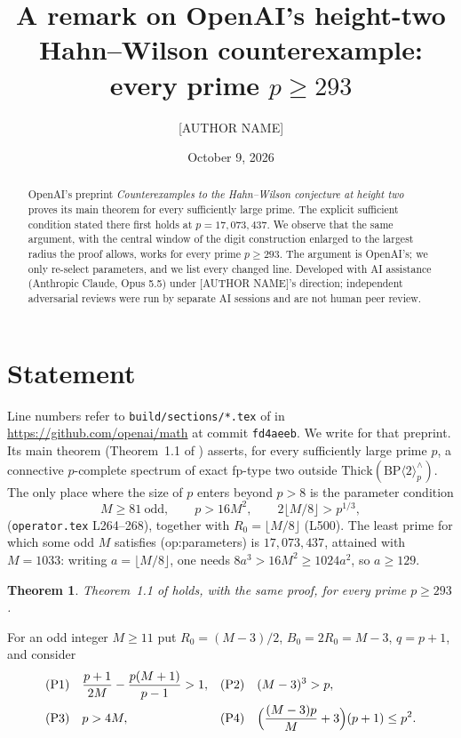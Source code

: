 \documentclass[11pt]{amsart}
\title{A remark on OpenAI's height-two Hahn--Wilson counterexample:\\ every prime $p\ge 293$}
\author{[AUTHOR NAME]}
\date{October 9, 2026}
\newtheorem{theorem}{Theorem}
\theoremstyle{remark}
\begin{document}
\begin{abstract}
OpenAI's preprint \emph{Counterexamples to the Hahn--Wilson conjecture at height two}
proves its main theorem for every sufficiently large prime. The explicit
sufficient condition stated there first holds at $p=17{,}073{,}437$. We
observe that the same argument, with the central window of the digit construction
enlarged to the largest radius the proof allows, works for every prime $p\ge293$.
The argument is OpenAI's; we only re-select parameters, and we list every changed
line. Developed with AI assistance (Anthropic Claude, Opus 5.5) under
[AUTHOR NAME]'s direction; independent adversarial reviews were run by separate
AI sessions and are not human peer review.
\end{abstract}
\maketitle

\section{Statement}
Line numbers refer to \texttt{build/sections/*.tex} of
in \url{https://github.com/openai/math} at commit \texttt{fd4aeeb}. We write
\cite{OAI319} for that preprint. Its main theorem (Theorem~1.1 of \cite{OAI319}) asserts, for every
sufficiently large prime $p$, a connective $p$-complete spectrum of exact fp-type two
outside $\mathrm{Thick}(\mathrm{BP}\langle2\rangle_p^\wedge)$. The only place where the size of $p$
enters beyond $p>8$ is the parameter condition
\begin{equation}\tag{op:parameters}
M\ge 81\ \text{odd},\qquad p>16M^2,\qquad 2\lfloor M/8\rfloor>p^{1/3},
\end{equation}
(\texttt{operator.tex} L264--268), together with $R_0=\lfloor M/8\rfloor$ (L500).
The least prime for which some odd $M$ satisfies (op:parameters) is $17{,}073{,}437$, attained with $M=1033$:
writing $a=\lfloor M/8\rfloor$, one needs $8a^3>16M^2\ge 1024a^2$, so $a\ge129$.

\begin{theorem}\label{thm}
Theorem~1.1 of \cite{OAI319} holds, with the same proof, for every prime $p\ge 293$.
\end{theorem}

For an odd integer $M\ge 11$ put $R_0=(M-3)/2$, $B_0=2R_0=M-3$, $q=p+1$, and consider
\begin{align*}
&\text{(P1)}\quad \frac{p+1}{2M}-\frac{p(M+1)}{p-1}>1, &&\text{(P2)}\quad (M-3)^3>p,\\
&\text{(P3)}\quad p>4M, &&\text{(P4)}\quad \Bigl(\frac{(M-3)p}{M}+3\Bigr)(p+1)\le p^2 .
\end{align*}
\end{document}
